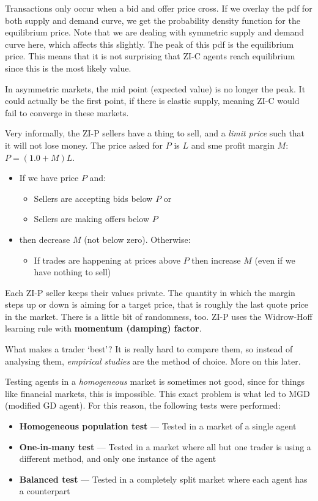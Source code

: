 \documentclass[11pt,a4paper,titlepage,dvipsnames,cmyk]{scrartcl}
\begin{document}
Transactions only occur when a bid and offer price cross. If we overlay the pdf for both supply and demand curve, we get the probability density function for the equilibrium price. Note that we are dealing with symmetric supply and demand curve here, which affects this slightly. The peak of this pdf is the equilibrium price. This means that it is not surprising that ZI-C agents reach equilibrium since this is the most likely value.

In asymmetric markets, the mid point (expected value) is no longer the peak. It could actually be the first point, if there is elastic supply, meaning ZI-C would fail to converge in these markets.

Very informally, the ZI-P sellers have a thing to sell, and a \textit{limit price} such that it will not lose money. The price asked for $P$ is $L$ and sme profit margin $M$: $P=(1.0+M)L$.
\begin{itemize}
    \item If we have price $P$ and:
\begin{itemize}
    \item Sellers are accepting bids below $P$ or
    \item Sellers are making offers below $P$
\end{itemize}
\item then decrease $M$ (not below zero). Otherwise:
\begin{itemize}
    \item If trades are happening at prices above $P$ then increase $M$ (even if we have nothing to sell)
\end{itemize}
\end{itemize}

Each ZI-P seller keeps their values private. The quantity in which the margin steps up or down is aiming for a target price, that is roughly the last quote price in the market. There is a little bit of randomness, too. ZI-P uses the Widrow-Hoff learning rule with \textbf{momentum (damping) factor}.

What makes a trader `best'? It is really hard to compare them, so instead of analysing them, \textit{empirical studies} are the method of choice. More on this later.

Testing agents in a \textit{homogeneous} market is sometimes not good, since for things like financial markets, this is impossible. This exact problem is what led to MGD (modified GD agent). For this reason, the following tests were performed:
\begin{itemize}
    \item \textbf{Homogeneous population test} --- Tested in a market of a single agent
    \item \textbf{One-in-many test} --- Tested in a market where all but one trader is using a different method, and only one instance of the agent
    \item \textbf{Balanced test} --- Tested in a completely split market where each agent has a counterpart
\end{itemize}
\end{document}
